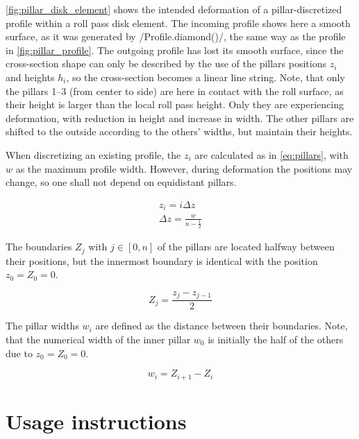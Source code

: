 \documentclass[11pt]{PyRollDocs}
\begin{document}
    \autoref{fig:pillar_disk_element} shows the intended deformation of a pillar-discretized profile within a roll pass disk element.
    The incoming profile shows here a smooth surface, as it was generated by \py/Profile.diamond()/, the same way as the profile in \autoref{fig:pillar_profile}.
    The outgoing profile has lost its smooth surface, since the cross-section shape can only be described by the use of the pillars positions $z_i$ and heights $h_i$, so the cross-section becomes a linear line string.
    Note, that only the pillars 1--3 (from center to side) are here in contact with the roll surface, as their height is larger than the local roll pass height.
    Only they are experiencing deformation, with reduction in height and increase in width.
    The other pillars are shifted to the outside according to the others' widths, but maintain their heights.

    When discretizing an existing profile, the $z_i$ are calculated as in \autoref{eq:pillars}, with $w$ as the maximum profile width.
    However, during deformation the positions may change, so one shall not depend on equidistant pillars.

    \begin{subequations}
        \begin{gather}
            z_i = i \Delta z \\
            \Delta z = \frac{w}{n - \frac{1}{2}}
        \end{gather}
        \label{eq:pillars}
    \end{subequations}

    The boundaries $Z_j$ with $j \in [0, n]$ of the pillars are located halfway between their positions, but the innermost boundary is identical with the position $z_0 = Z_0 = 0$.

    \begin{equation}
        Z_j = \frac{z_j - z_{j-1}}{2}
        \label{eq:pillar_boundaries}
    \end{equation}

    The pillar widths $w_i$ are defined as the distance between their boundaries.
    Note, that the numerical width of the inner pillar $w_0$ is initially the half of the others due to $z_0 = Z_0 = 0$.

    \begin{equation}
        w_i = Z_{i+1} - Z_i
        \label{eq:pillar_widths}
    \end{equation}


    \section{Usage instructions}\label{sec:usage-instructions}
\end{document}
